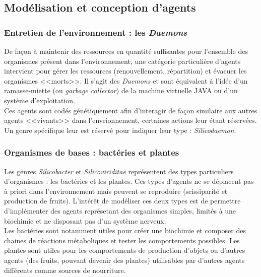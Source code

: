 \documentclass[11pt,twoside,a4paper]{article}
\begin{document}
\subsection{Mod{\'e}lisation et conception d'agents}

\subsubsection{Entretien de l'environnement : les \emph{Daemons}}

De fa\c{c}on {\`a} maintenir des ressources en quantit{\'e} suffisantes pour l'ensemble des organismes pr{\'e}sent dans l'environnement, une cat{\'e}gorie particuli{\`e}re d'agents intervient pour g{\'e}rer les ressources (renouvellement, r{\'e}partition) et {\'e}vacuer les organismes <<morts>>. Il s'agit des \emph{Daemons} et sont {\'e}quivalent {\`a} l'id{\'e}e d'un ramasse-miette (ou \emph{garbage collector}) de la machine virtuelle JAVA ou d'un syst{\`e}me d'exploitation.~\\

Ces agents sont cod{\'e}s g{\'e}n{\'e}tiquement afin d'interagir de fa\c{c}on similaire aux autres agents <<vivants>> dans l'envrionnement, certaines actions leur {\'e}tant r{\'e}serv{\'e}es. Un genre sp{\'e}cifique leur est r{\'e}serv{\'e} pour indiquer leur type : \emph{Silicodaemon}. 

\subsubsection{Organismes de bases : bact{\'e}ries et plantes}

Les genres \emph{Silicobacter} et \emph{Silicoviriditae} repr{\'e}sentent des types particuliers d'organismes : les bact{\'e}ries et les plantes. Ces types d'agents ne se d{\'e}placent pas {\`a} priori dans l'environnement mais peuvent se reproduire (scissiparit{\'e} et production de fruits). L'int{\'e}r{\^e}t de mod{\'e}liser ces deux types est de permettre d'impl{\'e}menter des agents repr{\'e}setant des organismes simples, limit{\'e}s {\`a} une biochimie et ne disposant pas d'un syst{\`e}me nerveux.~\\

Les bact{\'e}ries sont notamment utiles pour cr{\'e}er une biochimie et composer des chaines de r{\'e}actions m{\'e}taboliques et tester les comportements possibles. Les plantes sont utiles pour les comportements de production d'objets ou d'autres agents (des fruits, pouvant devenir des plantes) utilisables par d'autres agents diff{\'e}rents comme sources de nourriture. 
\end{document}
